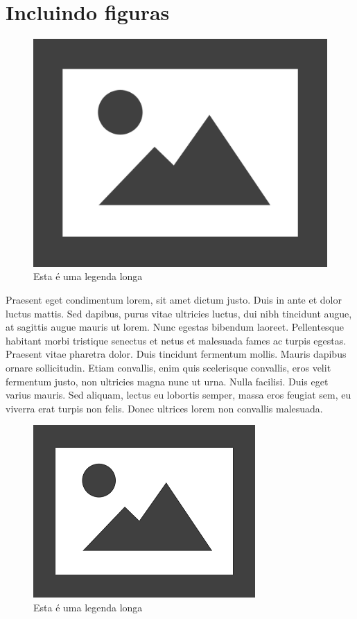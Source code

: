 \documentclass{article}
\begin{document}
	\section*{Incluindo figuras}
	
	\begin{figure}[H]
		\centering
		\includegraphics[width=0.5\linewidth]{Figuras/fig1}
		\caption[Legenda curta]{Esta é uma legenda longa}
		\label{fig:fig1}
	\end{figure}
	
	Praesent eget condimentum lorem, sit amet dictum justo. Duis in ante et dolor luctus mattis. Sed dapibus, purus vitae ultricies luctus, dui nibh tincidunt augue, at sagittis augue mauris ut lorem. Nunc egestas bibendum laoreet. Pellentesque habitant morbi tristique senectus et netus et malesuada fames ac turpis egestas. Praesent vitae pharetra dolor. Duis tincidunt fermentum mollis. Mauris dapibus ornare sollicitudin. Etiam convallis, enim quis scelerisque convallis, eros velit fermentum justo, non ultricies magna nunc ut urna. Nulla facilisi. Duis eget varius mauris. Sed aliquam, lectus eu lobortis semper, massa eros feugiat sem, eu viverra erat turpis non felis. Donec ultrices lorem non convallis malesuada.
	
	
	\begin{figure}[H]  %
		\centering
		\includegraphics[width=0.5\linewidth]{Figuras/fig2}
		\caption[Legenda curta]{Esta é uma legenda longa}
		\label{fig:fig2}
	\end{figure}
	
\end{document}
